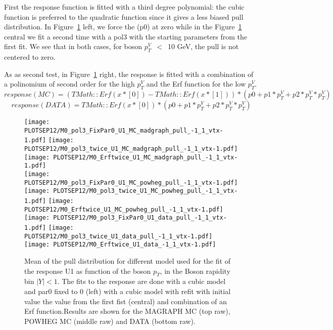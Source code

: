 \documentclass[41pt,a4paper,oneside]{report}
\begin{document}
First the response function is fitted with a  third degree polynomial: 
the cubic function is preferred to the quadratic function since it gives a less biased pull distribution. 
In Figure~\ref{fig:BIASpull} left, we force the (p0) at zero while in the Figure~\ref{fig:BIASpull} central we fit a second time with a pol3 with the starting parameters from the first fit.
We see that in both cases, for boson $p^{V}_{T}$~$<$~10 GeV, the pull is not centered to zero. 

As as second test, in Figure~\ref{fig:BIASpull} right, the response is fitted with a combination of a polinomium of second order for the high $p^{V}_{T}$ and the Erf function for the low $p^{V}_{T}$.
\begin{equation}
response (MC) =(TMath::Erf(x*[0]) - TMath::Erf(x*[1]) )*(p0 + p1 * p^{V}_{T} + p2 * p^{V}_{T} * p^{V}_{T})
\end{equation}
\begin{equation}
response (DATA) =TMath::Erf(x*[0])*(p0 + p1 * p^{V}_{T} + p2 * p^{V}_{T} * p^{V}_{T})
\end{equation}

\begin{figure}[h!]
  \begin{center}

    \texttt{[image: PLOTSEP12/M0\_pol3\_FixPar0\_U1\_MC\_madgraph\_pull\_-1\_1\_vtx-1.pdf]}
    \texttt{[image: PLOTSEP12/M0\_pol3\_twice\_U1\_MC\_madgraph\_pull\_-1\_1\_vtx-1.pdf]}
    \texttt{[image: PLOTSEP12/M0\_Erftwice\_U1\_MC\_madgraph\_pull\_-1\_1\_vtx-1.pdf]}\\

    \texttt{[image: PLOTSEP12/M0\_pol3\_FixPar0\_U1\_MC\_powheg\_pull\_-1\_1\_vtx-1.pdf]}
    \texttt{[image: PLOTSEP12/M0\_pol3\_twice\_U1\_MC\_powheg\_pull\_-1\_1\_vtx-1.pdf]}
    \texttt{[image: PLOTSEP12/M0\_Erftwice\_U1\_MC\_powheg\_pull\_-1\_1\_vtx-1.pdf]}\\

    \texttt{[image: PLOTSEP12/M0\_pol3\_FixPar0\_U1\_data\_pull\_-1\_1\_vtx-1.pdf]}
    \texttt{[image: PLOTSEP12/M0\_pol3\_twice\_U1\_data\_pull\_-1\_1\_vtx-1.pdf]}
    \texttt{[image: PLOTSEP12/M0\_Erftwice\_U1\_data\_-1\_1\_vtx-1.pdf]}\\

    \caption{Mean of the pull distribution for different model used for the fit of the response U1 as function of the boson $p_{T}$, in the Boson rapidity bin $|Y|<1$.
 The fits to the response are done with a cubic model and par0 fixed to 0 (left) with a cubic model with refit with initial value the value from the first fist (central) and combination of an Erf function.Results are shown for the MAGRAPH MC (top raw), POWHEG MC (middle raw) and DATA (bottom raw).
}
    \label{fig:BIASpull}
  \end{center}
\end{figure}
\end{document}
